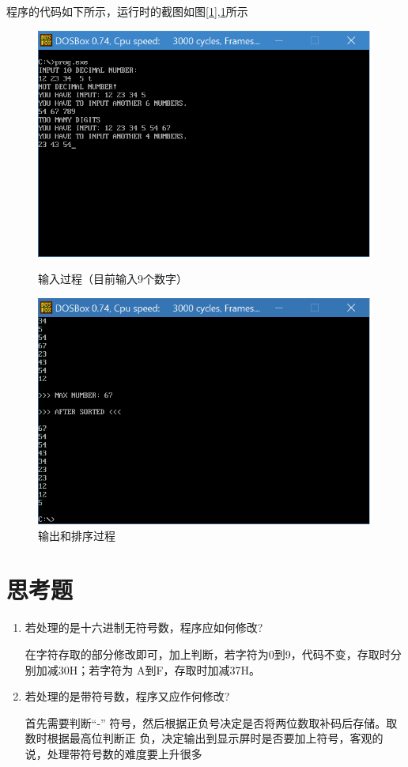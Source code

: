 \documentclass[UTF8,a4paper]{ctexart}
\begin{document}
程序的代码如下所示，运行时的截图如图\ref{1},\ref{2}所示\\



\begin{figure}
\centering
\includegraphics[width=\textwidth]{1.png}
\caption{输入过程（目前输入9个数字）}
\label{1}
\includegraphics[width=\textwidth]{2.png}
\caption{输出和排序过程}
\label{2}
\end{figure}
\section{思考题}
\begin{enumerate}
\item 若处理的是十六进制无符号数，程序应如何修改?

在字符存取的部分修改即可，加上判断，若字符为0到9，代码不变，存取时分别加减30H；若字符为
A到F，存取时加减37H。
\item 若处理的是带符号数，程序又应作何修改?

首先需要判断“-” 符号，然后根据正负号决定是否将两位数取补码后存储。取数时根据最高位判断正
负，决定输出到显示屏时是否要加上符号，客观的说，处理带符号数的难度要上升很多
\end{enumerate}
\end{document}
